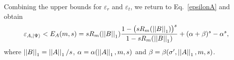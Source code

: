 Combining the upper bounds for $\varepsilon_r$ and $\varepsilon_t$, we return to Eq.\ \eqref{epsilonA} and obtain
\begin{equation}
\label{overallupperbound}
\varepsilon_{A,|\Psi\rangle}<\nonumber E_A(m,s)=sR_m(\left|\left|B\right|\right|_1)\frac{1-\big(sR_m(\left|\left|B\right|\right|_1)\big)^s}{1-sR_m(\left|\left|B\right|\right|_1)}+(\alpha+\beta)^s-\alpha^s,
\end{equation}
where $\left|\left|B\right|\right|_1=\left|\left|A\right|\right|_1/s$, $\alpha=\alpha(\left|\left|A\right|\right|_1,m,s)$ and $\beta=\beta(\sigma',\left|\left|A\right|\right|_1,m,s)$.

